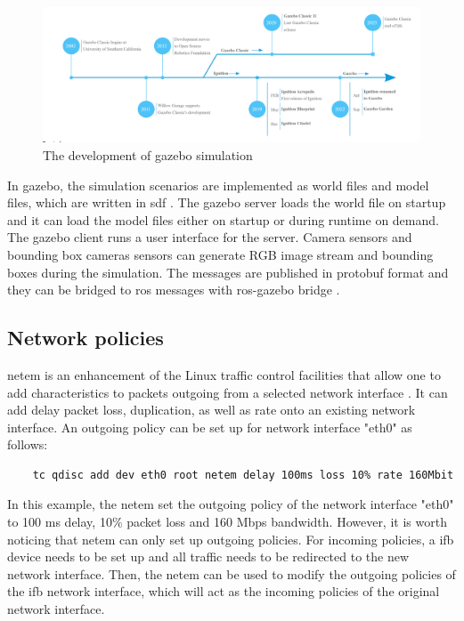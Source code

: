 \begin{figure}
    \centering
    \includegraphics[width=\linewidth]{figures/background/gazebo_development.png}
    \caption[The development of \gls{gazebo} simulation]{The development of \gls{gazebo} simulation \cite{GazeboSim}}
    \label{fig:gazebo_development}
\end{figure}

In \gls{gazebo}, the simulation scenarios are implemented as world files and model files, which are written in \gls{sdf} \cite{SDFormat}. The \gls{gazebo} server loads the world file on startup and it can load the model files either on startup or during runtime on demand. The \gls{gazebo} client runs a user interface for the server. Camera sensors and bounding box cameras sensors can generate RGB image stream and bounding boxes during the simulation. The messages are published in \gls{protobuf} format and they can be bridged to \gls{ros} messages with \gls{ros}-\gls{gazebo} bridge \cite{GazeboSim}. 



\subsection{Network policies}

\acrfull{netem} is an enhancement of the Linux traffic control facilities that allow one to add characteristics to packets outgoing from a selected network interface \cite{tc-netem}. It can add delay packet loss, duplication, as well as rate onto an existing network interface. An outgoing policy can be set up for network interface "eth0" as follows: 

\begin{verbatim}
    tc qdisc add dev eth0 root netem delay 100ms loss 10% rate 160Mbit
\end{verbatim}

In this example, the \gls{netem} set the outgoing policy of the network interface "eth0" to 100 ms delay, 10\% packet loss and 160 Mbps bandwidth. However, it is worth noticing that \gls{netem} can only set up outgoing policies. For incoming policies, a \gls{ifb} device needs to be set up and all traffic needs to be redirected to the new network interface. Then, the \gls{netem} can be used to modify the outgoing policies of the \gls{ifb} network interface, which will act as the incoming policies of the original network interface.
